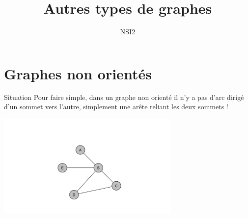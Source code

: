 \documentclass[10pt]{beamer}
\title{Autres types de graphes}
\author{NSI2}
\begin{document}
\maketitle

\section{Graphes non orientés}

\begin{frame}{Situation}
Pour faire simple, dans un graphe non orienté il n'y a pas d'arc dirigé d'un sommet vers l'autre, simplement une arête reliant les deux sommets !

\begin{center}
\includegraphics[width=9cm]{img/graph1}
\end{center}
\end{frame}
\end{document}
